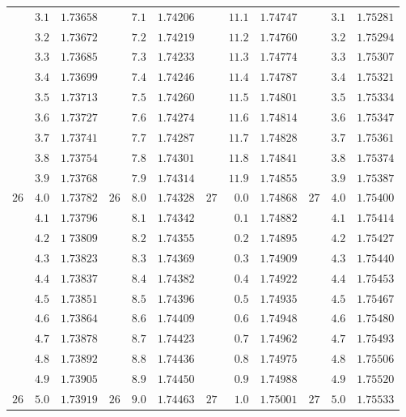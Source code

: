 \begin{center}
{\begin{tabular}{rr|r||rr|r||rr|r||rr|r}
 & $3.1$ & $1.73658$ &  & $7.1$ & $1.74206$ &  & $11.1$ & $1.74747$ &  & $3.1$ & $1.75281$\\
 & $3.2$ & $1.73672$ &  & $7.2$ & $1.74219$ &  & $11.2$ & $1.74760$ &  & $3.2$ & $1.75294$\\
 & $3.3$ & $1.73685$ &  & $7.3$ & $1.74233$ &  & $11.3$ & $1.74774$ &  & $3.3$ & $1.75307$\\
 & $3.4$ & $1.73699$ &  & $7.4$ & $1.74246$ &  & $11.4$ & $1.74787$ &  & $3.4$ & $1.75321$\\
 & $3.5$ & $1.73713$ &  & $7.5$ & $1.74260$ &  & $11.5$ & $1.74801$ &  & $3.5$ & $1.75334$\\
 & $3.6$ & $1.73727$ &  & $7.6$ & $1.74274$ &  & $11.6$ & $1.74814$ &  & $3.6$ & $1.75347$\\
 & $3.7$ & $1.73741$ &  & $7.7$ & $1.74287$ &  & $11.7$ & $1.74828$ &  & $3.7$ & $1.75361$\\
 & $3.8$ & $1.73754$ &  & $7.8$ & $1.74301$ &  & $11.8$ & $1.74841$ &  & $3.8$ & $1.75374$\\
 & $3.9$ & $1.73768$ &  & $7.9$ & $1.74314$ &  & $11.9$ & $1.74855$ &  & $3.9$ & $1.75387$\\[4pt]
$26$ & $4.0$ & $1.73782$ & $26$ & $8.0$ & $1.74328$ & $27$ & $0.0$ & $1.74868$ & $27$ & $4.0$ & $1.75400$\\
 & $4.1$ & $1.73796$ &  & $8.1$ & $1.74342$ &  & $0.1$ & $1.74882$ &  & $4.1$ & $1.75414$\\
 & $4.2$ & $1\;73809$ &  & $8.2$ & $1.74355$ &  & $0.2$ & $1.74895$ &  & $4.2$ & $1.75427$\\
 & $4.3$ & $1.73823$ &  & $8.3$ & $1.74369$ &  & $0.3$ & $1.74909$ &  & $4.3$ & $1.75440$\\
 & $4.4$ & $1.73837$ &  & $8.4$ & $1.74382$ &  & $0.4$ & $1.74922$ &  & $4.4$ & $1.75453$\\
 & $4.5$ & $1.73851$ &  & $8.5$ & $1.74396$ &  & $0.5$ & $1.74935$ &  & $4.5$ & $1.75467$\\
 & $4.6$ & $1.73864$ &  & $8.6$ & $1.74409$ &  & $0.6$ & $1.74948$ &  & $4.6$ & $1.75480$\\
 & $4.7$ & $1.73878$ &  & $8.7$ & $1.74423$ &  & $0.7$ & $1.74962$ &  & $4.7$ & $1.75493$\\
 & $4.8$ & $1.73892$ &  & $8.8$ & $1.74436$ &  & $0.8$ & $1.74975$ &  & $4.8$ & $1.75506$\\
 & $4.9$ & $1.73905$ &  & $8.9$ & $1.74450$ &  & $0.9$ & $1.74988$ &  & $4.9$ & $1.75520$\\[4pt]
$26$ & $5.0$ & $1.73919$ & $26$ & $9.0$ & $1.74463$ & $27$ & $1.0$ & $1.75001$ & $27$ & $5.0$ & $1.75533$\\

\end{tabular}}
\end{center}
